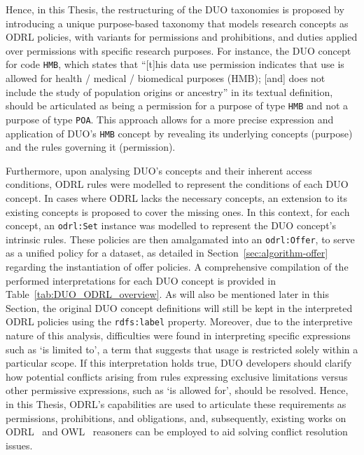 Hence, in this Thesis, the restructuring of the DUO taxonomies is proposed by introducing a unique purpose-based taxonomy that models research concepts as ODRL policies, with variants for permissions and prohibitions, and duties applied over permissions with specific research purposes.
For instance, the DUO concept for code \texttt{HMB}, which states that ``[t]his data use permission indicates that use is allowed for health / medical / biomedical purposes (HMB); [and] does not include the study of population origins or ancestry'' in its textual definition, should be articulated as being a permission for a purpose of type \texttt{HMB} and not a purpose of type \texttt{POA}.
This approach allows for a more precise expression and application of DUO's \texttt{HMB} concept by revealing its underlying concepts (purpose) and the rules governing it (permission).

Furthermore, upon analysing DUO's concepts and their inherent access conditions, ODRL rules were modelled to represent the conditions of each DUO concept.
In cases where ODRL lacks the necessary concepts, an extension to its existing concepts is proposed to cover the missing ones.
In this context, for each concept, an \texttt{odrl:Set} instance was modelled to represent the DUO concept's intrinsic rules.
These policies are then amalgamated into an \texttt{odrl:Offer}, to serve as a unified policy for a dataset, as detailed in Section~\ref{sec:algorithm-offer} regarding the instantiation of offer policies.
A comprehensive compilation of the performed interpretations for each DUO concept is provided in Table~\ref{tab:DUO_ODRL_overview}.
As will also be mentioned later in this Section, the original DUO concept definitions will still be kept in the interpreted ODRL policies using the \texttt{rdfs:label} property.
Moreover, due to the interpretive nature of this analysis, difficulties were found in interpreting specific expressions such as `is limited to', a term that suggests that usage is restricted solely within a particular scope.
If this interpretation holds true, DUO developers should clarify how potential conflicts arising from rules expressing exclusive limitations versus other permissive expressions, such as `is allowed for', should be resolved.
Hence, in this Thesis, ODRL's capabilities are used to articulate these requirements as permissions, prohibitions, and obligations, and, subsequently, existing works on ODRL~\citep{pellegrini_automated_2018,de_vos_odrl_2019} and OWL~\citep{bonatti_realtime_2020} reasoners can be employed to aid solving conflict resolution issues.

